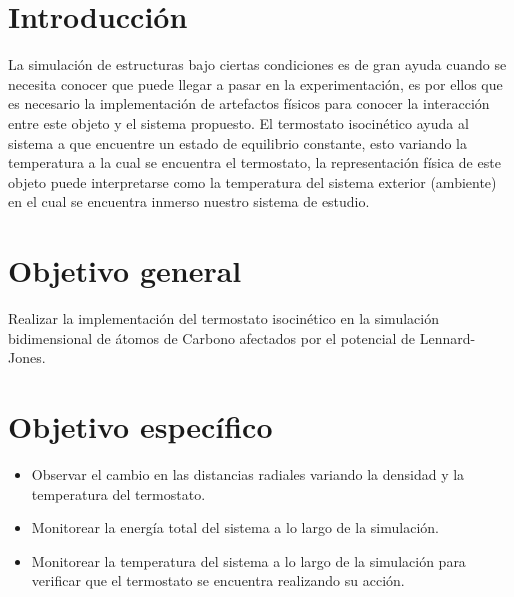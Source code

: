 \documentclass[reprint,amsmath,amssymb,aps,]{revtex4-2}
\begin{document}
\maketitle
\section{Introducción}
La simulación de estructuras bajo ciertas condiciones es de gran ayuda cuando se necesita conocer que puede llegar a pasar en la experimentación,
es por ellos que es necesario la implementación de artefactos físicos para conocer la interacción entre este objeto y el sistema propuesto.
El termostato isocinético ayuda al sistema a que encuentre un estado de equilibrio constante, esto variando la temperatura a la cual se encuentra el termostato,
la representación física de este objeto puede interpretarse como la temperatura del sistema exterior (ambiente) en el cual se encuentra inmerso nuestro sistema de estudio.
\section{Objetivo general}
Realizar la implementación del termostato isocinético en la simulación bidimensional de átomos de
 Carbono afectados por el potencial de Lennard-Jones.
 \section{Objetivo específico}
 \begin{itemize}
     \item Observar el cambio en las distancias radiales variando la densidad y la temperatura del termostato.
     \item Monitorear la energía total del sistema a lo largo de la simulación.
     \item Monitorear la temperatura del sistema a lo largo de la simulación para verificar que el termostato se encuentra realizando
     su acción.
 \end{itemize}
\end{document}
